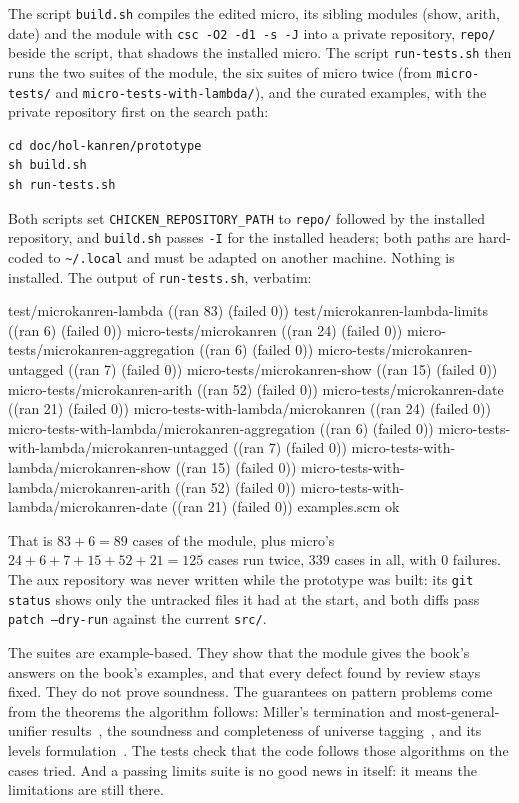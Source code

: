 The script \texttt{build.sh} compiles the edited micro, its sibling modules (show, arith, date) and the
module with \texttt{csc -O2 -d1 -s -J} into a private repository, \texttt{repo/} beside the script, that
shadows the installed micro. The script \texttt{run-tests.sh} then runs the two suites of the module,
the six suites of micro twice (from \texttt{micro-tests/} and \texttt{micro-tests-with-lambda/}), and the
curated examples, with the private repository first on the search path:
\begin{Verbatim}[xrightmargin=-\overhang]
cd doc/hol-kanren/prototype
sh build.sh
sh run-tests.sh
\end{Verbatim}
Both scripts set \texttt{CHICKEN\_REPOSITORY\_PATH} to \texttt{repo/} followed by the installed repository,
and \texttt{build.sh} passes \texttt{-I} for the installed headers; both paths are hard-coded to
\texttt{\textasciitilde/.local} and must be adapted on another machine. Nothing is installed. The output of
\texttt{run-tests.sh}, verbatim:
\begin{answers}
test/microkanren-lambda ((ran 83) (failed 0))
test/microkanren-lambda-limits ((ran 6) (failed 0))
micro-tests/microkanren ((ran 24) (failed 0))
micro-tests/microkanren-aggregation ((ran 6) (failed 0))
micro-tests/microkanren-untagged ((ran 7) (failed 0))
micro-tests/microkanren-show ((ran 15) (failed 0))
micro-tests/microkanren-arith ((ran 52) (failed 0))
micro-tests/microkanren-date ((ran 21) (failed 0))
micro-tests-with-lambda/microkanren ((ran 24) (failed 0))
micro-tests-with-lambda/microkanren-aggregation ((ran 6) (failed 0))
micro-tests-with-lambda/microkanren-untagged ((ran 7) (failed 0))
micro-tests-with-lambda/microkanren-show ((ran 15) (failed 0))
micro-tests-with-lambda/microkanren-arith ((ran 52) (failed 0))
micro-tests-with-lambda/microkanren-date ((ran 21) (failed 0))
examples.scm ok
\end{answers}
That is $83+6=89$ cases of the module, plus micro's $24+6+7+15+52+21=125$ cases run twice, $339$ cases
in all, with 0 failures. The aux repository was never written while the prototype was built: its
\texttt{git status} shows only the untracked files it had at the start, and both diffs pass
\texttt{patch --dry-run} against the current \texttt{src/}.

\begin{pitfall}
The suites are example-based. They show that the module gives the book's answers on the book's examples,
and that every defect found by review stays fixed. They do not prove soundness. The guarantees on pattern
problems come from the theorems the algorithm follows: Miller's termination and most-general-unifier
results~\cite{Miller1991}, the soundness and completeness of universe tagging~\cite{NadathurJayaramanKwon1995},
and its levels formulation~\cite{NadathurLinnell2005}. The tests check that the code follows those
algorithms on the cases tried. And a passing limits suite is no good news in itself: it means the
limitations are still there.
\end{pitfall}

